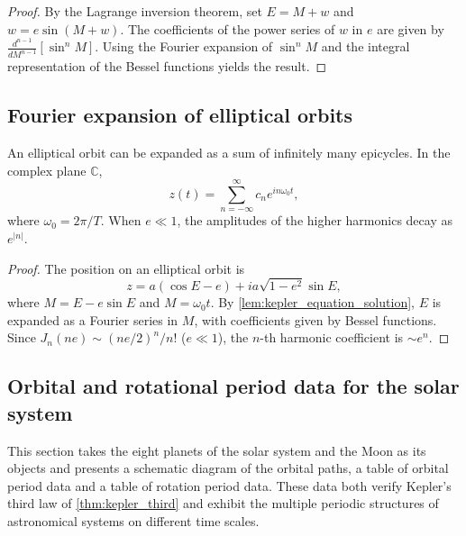 \begin{proof}
By the Lagrange inversion theorem, set \(E=M+w\) and \(w=e\sin(M+w)\). The coefficients of the power series of \(w\) in \(e\) are given by \(\frac{d^{n-1}}{dM^{n-1}}[\sin^n M]\). Using the Fourier expansion of \(\sin^n M\) and the integral representation of the Bessel functions yields the result.
\end{proof}

\subsection{Fourier expansion of elliptical orbits}

\begin{proposition}\label{prop:elliptic_epicycle_expansion}
An elliptical orbit can be expanded as a sum of infinitely many epicycles. In the complex plane \(\mathbb C\),
\[
z(t)=\sum_{n=-\infty}^{\infty}c_n e^{in\omega_0 t},
\]
where \(\omega_0=2\pi/T\). When \(e\ll1\), the amplitudes of the higher harmonics decay as \(e^{|n|}\).
\end{proposition}

\begin{proof}
The position on an elliptical orbit is
\[
z=a(\cos E-e)+ia\sqrt{1-e^2}\sin E,
\]
where \(M=E-e\sin E\) and \(M=\omega_0t\). By \cref{lem:kepler_equation_solution}, \(E\) is expanded as a Fourier series in \(M\), with coefficients given by Bessel functions. Since \(J_n(ne)\sim(ne/2)^n/n!\) (\(e\ll1\)), the \(n\)-th harmonic coefficient is \(\sim e^n\).
\end{proof}

\subsection{Orbital and rotational period data for the solar system}
\label{subsec:solar_system_periods}

This section takes the eight planets of the solar system and the Moon as its objects and presents a schematic diagram of the orbital paths, a table of orbital period data and a table of rotation period data. These data both verify Kepler's third law of \cref{thm:kepler_third} and exhibit the multiple periodic structures of astronomical systems on different time scales.

